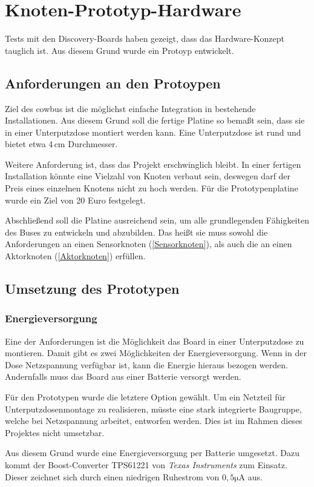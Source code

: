 \documentclass{IEEEtran}
\begin{document}
\section{Knoten-Prototyp-Hardware}
Tests mit den Discovery-Boards haben gezeigt, dass das Hardware-Konzept tauglich ist.
Aus diesem Grund wurde ein Protoyp entwickelt.

\subsection{Anforderungen an den Protoypen}
Ziel des cowbus ist die möglichst einfache Integration in bestehende Installationen.
Aus diesem Grund soll die fertige Platine so bemaßt sein, dass sie in einer Unterputzdose montiert werden kann.
Eine Unterputzdose ist rund und bietet etwa 4\,cm Durchmesser.

Weitere Anforderung ist, dass das Projekt erschwinglich bleibt.
In einer fertigen Installation könnte eine Vielzahl von Knoten verbaut sein, deswegen darf der Preis eines einzelnen Knotens nicht zu hoch werden.
Für die Prototypenplatine wurde ein Ziel von 20 Euro festgelegt.

Abschließend soll die Platine ausreichend sein, um alle grundlegenden Fähigkeiten des Buses zu entwickeln und abzubilden.
Das heißt sie muss sowohl die Anforderungen an einen Sensorknoten (\ref{Sensorknoten}), als auch die an einen Aktorknoten (\ref{Aktorknoten}) erfüllen.

\subsection{Umsetzung des Prototypen}


\subsubsection{Energieversorgung}
Eine der Anforderungen ist die Möglichkeit das Board in einer Unterputzdose zu montieren.
Damit gibt es zwei Möglichkeiten der Energieversorgung.
Wenn in der Dose Netzspannung verfügbar ist, kann die Energie hieraus bezogen werden.
Andernfalls muss das Board aus einer Batterie versorgt werden.

Für den Prototypen wurde die letztere Option gewählt.
Um ein Netzteil für Unterputzdosenmontage zu realisieren, müsste eine stark integrierte Baugruppe, welche bei Netzspannung arbeitet, entworfen werden.
Dies ist im Rahmen dieses Projektes nicht umsetzbar.

Aus diesem Grund wurde eine Energieversorgung per Batterie umgesetzt.
Dazu kommt der Boost-Converter TPS61221 von \emph{Texas Instruments} zum Einsatz.
Dieser zeichnet sich durch einen niedrigen Ruhestrom von $0,5 \mathrm{\mu A}$ aus.
\end{document}
